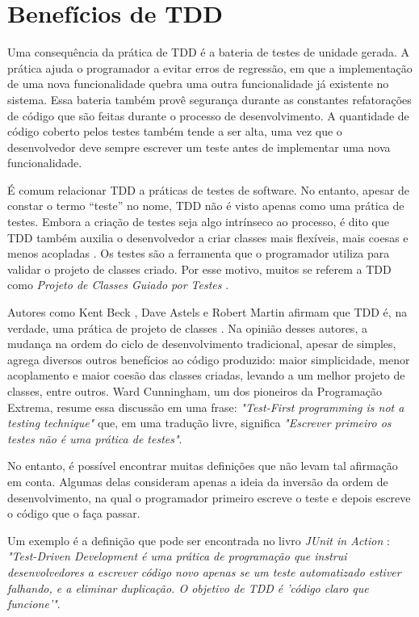 \section{Benefícios de TDD}

Uma consequência da prática de TDD é a bateria de testes de unidade gerada.
A prática ajuda o programador a evitar erros de regressão, em que a implementação de
uma nova funcionalidade quebra uma outra funcionalidade já existente no sistema.
Essa bateria também provê segurança durante as
constantes refatorações de código que são feitas durante o processo de
desenvolvimento.
A quantidade de código coberto pelos testes também tende a ser alta, uma vez que o
desenvolvedor deve sempre escrever um teste antes de implementar uma nova
funcionalidade. 

É comum relacionar TDD a práticas de testes de software. No entanto, apesar de constar o
termo ``teste'' no nome, TDD não é visto apenas como uma prática de testes.
Embora a criação de testes seja algo intrínseco ao processo, é dito que TDD também 
auxilia o desenvolvedor a criar classes mais flexíveis, mais coesas e
menos acopladas \cite{aim-fire} \cite{bob-martin} \cite{astels-tdd}. Os testes
são a ferramenta que o programador utiliza para validar o projeto de classes criado. 
Por esse motivo, muitos se referem a TDD como
\textit{Projeto de Classes Guiado por Testes} \cite{tdd-taxonomy}.

Autores como Kent Beck \cite{aim-fire}, Dave Astels \cite{astels-tdd} e
Robert Martin \cite{bob-martin} afirmam que TDD é, na verdade, uma prática de
projeto de classes \cite{tdd-taxonomy} \cite{aim-fire}.
Na opinião desses autores, a mudança na ordem do ciclo de
desenvolvimento tradicional, apesar de simples, agrega diversos outros
benefícios ao código produzido: maior simplicidade, menor acoplamento e maior
coesão das classes criadas, levando a um melhor projeto de classes, entre
outros. Ward Cunningham, um dos pioneiros da Programação Extrema, resume essa 
discussão em uma frase: \textit{"Test-First programming is not a testing technique"} 
que, em uma tradução livre, significa \textit{"Escrever primeiro os testes
não é uma prática de testes"}.

No entanto, é possível encontrar muitas definições que
não levam tal afirmação em conta. Algumas delas consideram apenas a ideia da
inversão da ordem de desenvolvimento, na qual o programador primeiro
escreve o teste e depois escreve o código que o faça passar.

Um exemplo é a definição que pode ser encontrada no livro \textit{JUnit
in Action} \cite{junit-in-action}: \textit{"Test-Driven Development é uma
prática de programação que instrui desenvolvedores a escrever código novo
apenas se um teste automatizado estiver falhando, e a eliminar duplicação. O
objetivo de TDD é 'código claro que funcione'"}.

